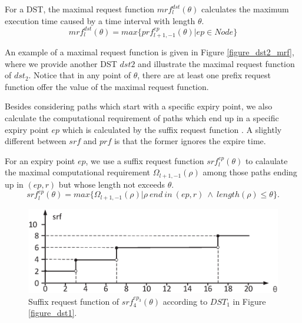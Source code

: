 \documentclass[sigconf]{acmart}
\begin{document}
\begin{definition}
For a DST, the maximal request function $mrf^{dst}_l(\theta)$ calculates the maximum execution time caused by a time interval with length $\theta$.%
\begin{equation}
mrf^{dst}_l(\theta)=max\{prf^{ep}_{l+1,-1}(\theta)|ep\in Node\}
\end{equation}\label{equation_mrf}
\end{definition}

An example of a maximal request function is given in Figure \ref{figure_dst2_mrf}, where we provide another DST $dst2$ and illustrate the maximal request function of $dst_2$. Notice that in any point of $\theta$, there are at least one prefix request function offer the value of the maximal request function.

Besides considering paths which start with a specific expiry point, we also calculate the computational requirement of paths which end up in a specific expiry point $ep$ which is calculated by the suffix request function \cite{DBLP:journals/rts/Stigge015a}. A slightly different between $srf$ and $prf$ is that the former ignores the expire time.%

\begin{definition}
For an expiry point $ep$, we use a suffix request function $srf^{ep}_{l}(\theta)$ to calaulate the maximal computational requirement $\Omega_{l+1,-1}(\rho)$ among those paths ending up in $(ep,r)$ but whose length not exceeds $\theta$.
\begin{equation}
srf^{ep}_l(\theta)=max\{\Omega_{l+1,-1}(\rho)|\rho\ end\ in\ (ep,r)\ \wedge\ length(\rho)\leq \theta\}.
\end{equation}\label{equation_srf}
\end{definition}
\begin{figure}[t]
  \centering
  \includegraphics[scale=0.31]{graphics/figure_srf.eps}
  \caption{Suffix request function of $srf^{ep_3}_{4}(\theta)$ according to $DST_1$ in Figure \ref{figure_dst1}.} 
  \label{figure_srf}
\end{figure}
\end{document}
